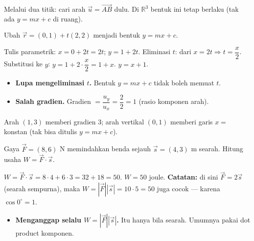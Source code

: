 \begin{variasi}
Melalui dua titik: cari arah $\vec u=\vec{AB}$ dulu. Di $\mathbb R^3$ bentuk ini
tetap berlaku (tak ada $y=mx+c$ di ruang).
\end{variasi}

\begin{soalbox}{}
Ubah $\vec r=(0,1)+t(2,2)$ menjadi bentuk $y=mx+c$.
\end{soalbox}

\jawab
{} Tulis parametrik: $x=0+2t=2t$; $y=1+2t$.
 Eliminasi $t$: dari $x=2t\Rightarrow t=\dfrac{x}{2}$.
 Substitusi ke $y$: $y=1+2\cdot\dfrac{x}{2}=1+x$.
\jadi $y=x+1$.

\begin{jebakan}
\begin{itemize}[leftmargin=*,topsep=2pt]
  \item \textbf{Lupa mengeliminasi $t$.} Bentuk $y=mx+c$ tidak boleh memuat $t$.
  \item \textbf{Salah gradien.} Gradien $=\dfrac{u_y}{u_x}=\dfrac22=1$ (rasio
  komponen arah).
\end{itemize}
\end{jebakan}

\begin{variasi}
Arah $(1,3)$ memberi gradien $3$; arah vertikal $(0,1)$ memberi garis $x=$
konstan (tak bisa ditulis $y=mx+c$).
\end{variasi}

\begin{soalbox}{}
Gaya $\vec F=(8,6)$ N memindahkan benda sejauh $\vec s=(4,3)$ m searah. Hitung
usaha $W=\vec F\cdot\vec s$.
\end{soalbox}

\jawab
{} $W=\vec F\cdot\vec s=8\cdot4+6\cdot3=32+18=50$.
\jadi $W=50$ joule.
 \textbf{Catatan:} di sini $\vec F=2\vec s$ (searah sempurna), maka
$W=|\vec F||\vec s|=10\cdot5=50$ juga cocok --- karena $\cos0^\circ=1$.

\begin{jebakan}
\begin{itemize}[leftmargin=*,topsep=2pt]
  \item \textbf{Menganggap selalu $W=|\vec F||\vec s|$.} Itu hanya bila searah.
  Umumnya pakai dot product komponen.
\end{itemize}
\end{jebakan}

